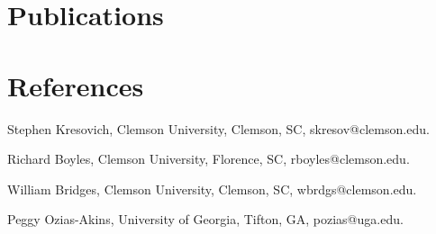 \documentclass[]{deedy-resume-openfont}
\begin{document}
\begin{minipage}[t]{0.68\textwidth}
\section{Publications} 
\renewcommand\refname{\vskip -1.5em} %


\nocite{*}


\sectionsep

\section{References}
\vspace{\topsep}
\begin{tightemize}
\item Stephen Kresovich, Clemson University, Clemson, SC, skresov@clemson.edu.
\item Richard Boyles, Clemson University, Florence, SC, rboyles@clemson.edu.
\item William Bridges, Clemson University, Clemson, SC, wbrdgs@clemson.edu.
\item Peggy Ozias-Akins, University of Georgia, Tifton, GA, pozias@uga.edu.
\end{tightemize}
\end{minipage} 
\end{document}
